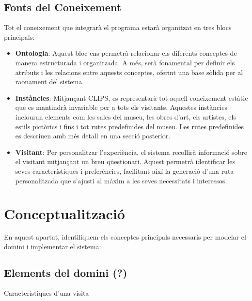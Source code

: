 \documentclass[a4paper]{article}
\begin{document}
	\subsection{Fonts del Coneixement}
	
	Tot el coneixement que integrarà el programa estarà organitzat en tres blocs principals:  
	\begin{itemize}  
		\item \textbf{Ontologia}: Aquest bloc ens permetrà relacionar els diferents conceptes de manera estructurada i organitzada. A més, serà fonamental per definir els atributs i les relacions entre aquests conceptes, oferint una base sòlida per al raonament del sistema.  
		
		\item \textbf{Instàncies}: Mitjançant CLIPS, es representarà tot aquell coneixement estàtic que es mantindrà invariable per a tots els visitants. Aquestes instàncies inclouran elements com les sales del museu, les obres d'art, els artistes, els estils pictòrics i fins i tot rutes predefinides del museu. Les rutes predefinides es descriuen amb més detall en una secció posterior.  
		
		\item \textbf{Visitant}: Per personalitzar l’experiència, el sistema recollirà informació sobre el visitant mitjançant un breu qüestionari. Aquest permetrà identificar les seves característiques i preferències, facilitant així la generació d’una ruta personalitzada que s’ajusti al màxim a les seves necessitats i interessos.  
	\end{itemize}  
	
	
	\section{Conceptualització}
	
	En aquest apartat, identifiquem els conceptes principals necessaris per modelar el domini i implementar el sistema:
	
	\subsection{Elements del domini (?)}
	\label{sec:elements_del_domini}
	
	Característiques d'una visita
	
\end{document}

